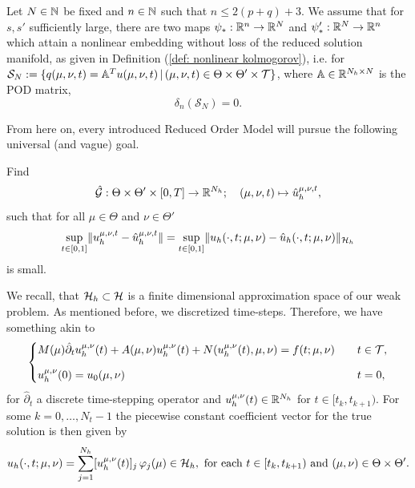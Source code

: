 \begin{assumption} \label{assumption perfect embedding}
    Let $N \in \mathbb{N}$ be fixed and $n \in \mathbb{N}$ such that $n \leq 2(p + q) + 3$. 
    We assume that for $s, s'$ sufficiently large, there are two maps 
    $\psi_*: \mathbb{R}^n \to \mathbb{R}^N$ and $\psi_*': \mathbb{R}^N \to \mathbb{R}^n$ 
    which attain a nonlinear embedding without loss of the reduced solution manifold, 
    as given in Definition (\ref{def: nonlinear kolmogorov}), i.e.
    for $\mathcal{S}_N := \{ q(\mu, \nu, t) = \mathbb{A}^T u(\mu, \nu, t) \, \vert \, (\mu, \nu, t) 
    \in \Theta \times \Theta' \times \mathcal{T} \}$, where $\mathbb{A} \in \mathbb{R}^{N_h \times N}$ is the POD matrix,
    \begin{equation*}
        \delta_n(\mathcal{S}_N) = 0.
    \end{equation*}
\end{assumption}



From here on, every introduced Reduced Order Model will pursue the following universal (and vague) goal.

\begin{goal}
    Find
    \begin{equation*}
        \hat{\mathcal{G}}: \Theta \times \Theta' \times [0, T] \to \mathbb{R}^{N_h}; \quad (\mu, \nu, t) \mapsto \hat{u}_h^{\mu, \nu, t},
    \end{equation*}
    such that for all $\mu \in \Theta$ and $\nu \in \Theta'$
    \begin{equation*}
        \sup\limits_{t \in [0, 1]}\lVert u_h^{\mu, \nu, t} - \hat{u}_h^{\mu, \nu, t} \rVert = 
        \sup\limits_{t \in [0, 1]}\lVert u_h(\cdot, t; \mu, \nu) - \hat{u}_h(\cdot, t; \mu, \nu) \rVert_{\mathcal{H}_h}
    \end{equation*}
    is small.
\end{goal}

We recall, that $\mathcal{H}_h \subset \mathcal{H}$ is a finite dimensional
approximation space of our weak problem. As mentioned before, we discretized time-steps.
Therefore, we have something akin to
\begin{equation} \label{eq: full discrete ppde}
    \begin{cases}
    \displaystyle
    M(\mu) \hat{\partial}_t u_h^{\mu, \nu}(t) + A(\mu, \nu) u_h^{\mu, \nu}(t) + 
    N(u_h^{\mu, \nu}(t), \mu, \nu)= f(t; \mu, \nu)  \quad &t \in \mathcal{T}, \\[0.8em]
    \displaystyle
    u_h^{\mu, \nu}(0) = u_0(\mu, \nu) \quad &t=0,
    \end{cases}
\end{equation}
for $\hat{\partial}_t$ a discrete time-stepping operator and $u_h^{\mu, \nu}(t) \in \mathbb{R}^{N_h}$ for
$t \in [t_k, t_{k+1})$. For some $k = 0, \dots, N_t - 1$ the piecewise constant coefficient vector for the true solution
is then given by
\begin{equation*}
    u_h(\cdot, t; \mu, \nu) = \sum_{j = 1}^{N_h} [u_h^{\mu, \nu}(t)]_j \, \varphi_j(\mu) \in \mathcal{H}_h, 
    \text{ for each } t \in  [t_k, t_{k+1}) \text{ and } (\mu, \nu) \in \Theta \times \Theta'. 
\end{equation*}



